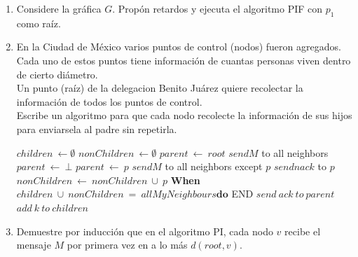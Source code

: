 \documentclass[12pt,a4paper]{report}
\begin{document}
	\begin{enumerate}
		\item {
			Considere la gráfica $G$. Propón retardos y ejecuta el algoritmo PIF con
			$p_1$ como raíz.\\
		}

		\item {
			En la Ciudad de México varios puntos de control (nodos) fueron agregados.\\
			Cada uno de estos puntos tiene información de cuantas personas viven
			dentro de cierto diámetro. \\
			Un punto (raíz) de la delegacion Benito Juárez quiere recolectar la
			información de todos los puntos de control. \\
			Escribe un algoritmo para que cada nodo recolecte la información de sus
			hijos para enviarsela al padre sin repetirla.\\

			\begin{algorithmic}[1]
				\State $children \ \leftarrow \emptyset$
				\State $nonChildren \ \leftarrow \emptyset$
					\State $parent\ \leftarrow\ root$
					\State $send M$ to all neighbors
				\Else
					\State $parent\ \leftarrow\ \bot$
				\EndIf
				\State {}
				\Start
						\State $parent\ \leftarrow\ p$
						\State $send M$ to all neighbors except $p$
					\Else
						\State $send nack$ to $p$
					\EndIf
				\End
				\State {}
				\Start
					\State $nonChildren\ \leftarrow\ nonChildren\ \cup\ {p}$
				\End
				\textbf{When} $children\ \cup\ nonChildren\ =\ allMyNeighbours
							\textbf{do}$
				\Start
						\State END
					\Else
						\State $send\ ack\ to\ parent$
					\EndIf
				\Start
					\State $add\ k\ to\ children$
				\End
				\End
			\end{algorithmic}
			}

		\item{
			Demuestre por inducción que en el algoritmo PI, cada nodo $v$ recibe el
			mensaje $M$ por primera vez en a lo más $d(root, v)$.\\

}
\end{enumerate}
\end{document}
